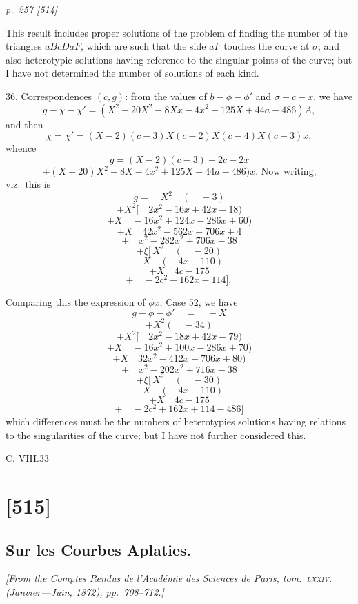 \documentclass[11pt,a4paper]{article}
\theoremstyle{plain}
\theoremstyle{definition}
\begin{document}
\clearpage

\bigskip
\textit{p.~257 [514]}
\smallskip

This result includes proper solutions of the problem of finding the number of
the triangles $aBcD aF$, which are such that the side $aF$ touches the curve at $\sigma$; and
also heterotypic solutions having reference to the singular points of the curve; but
I have not determined the number of solutions of each kind.

36.  Correspondences $(c, g)$: from the values of $b - \phi - \phi'$ and $\sigma - c - x$, we have
\[
g - \chi - \chi' = (X^2 - 20X^2 - 8Xx - 4x^2 + 125X + 44a - 486)A,
\]
and then
\[
\chi = \chi' = (X - 2)(c - 3)X(c - 2)X(c - 4)X(c - 3)x,
\]
whence
\[
g = (X - 2)(c - 3) - 2c - 2x
\]
\[
+ (X - 20)X^2 - 8X - 4x^2 + 125X + 44a - 486)x.  \text{ Now writing,}
\]
viz.\ this is
\[
g = \quad X^2 \quad ( \quad - 3)
\]
\[
+ X^2 [\quad 2x^2 - 16x + 42x - 18)
\]
\[
+ X \quad -16x^2 + 124x - 286x + 60)
\]
\[
+ X \quad 42x^2 - 562x + 706x + 4
\]
\[
+ \quad x^2 - 282x^2 + 706x - 38
\]
\[
+ \xi [\, X^2 \quad ( \quad - 20)
\]
\[
+ X \quad ( \quad 4x - 110)
\]
\[
+ X \quad 4c - 175
\]
\[
+ \quad -2c^2 - 162x - 114],
\]

Comparing this the expression of $\phi x$, Case 52, we have
\[
g - \phi - \phi' \quad = \quad - X
\]
\[
+ X^2 ( \quad - 34)
\]
\[
+ X^2 [ \quad 2x^2 - 18x + 42x - 79)
\]
\[
+ X \quad -16x^2 + 100x - 286x + 70)
\]
\[
+ X \quad 32x^2 - 412x + 706x + 80)
\]
\[
+ \quad x^2 - 202x^2 + 716x - 38
\]
\[
+ \xi [\, X^2 \quad ( \quad - 30)
\]
\[
+ X \quad ( \quad 4x - 110)
\]
\[
+ X \quad 4c - 175
\]
\[
+ \quad -2c^2 + 162x + 114 - 486]
\]
which differences must be the numbers of heterotypies solutions having relations to the
singularities of the curve; but I have not further considered this.

C. VIII.\hfill 33

\clearpage

\section{[515]}
\subsection{Sur les Courbes Aplaties.}

\begin{center}
\textit{[From the \textit{Comptes Rendus de l'Acad\'emie des Sciences de Paris}, tom.~\textsc{lxxiv}. (Janvier---Juin, 1872), pp.~708--712.]}
\end{center}
\end{document}
